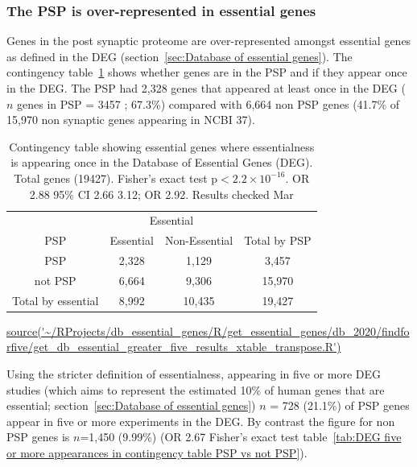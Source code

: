 \subsubsection{The PSP is over-represented in essential genes}
\label{sec:results over representation PSP in DEG genes}
Genes in the post synaptic proteome are over-represented amongst essential genes as defined in the DEG (section~\ref{sec:Database of essential genes}). The contingency table~\ref{tab:DEG any appearance contingency table PSP vs not PSP} shows whether genes are in the PSP and if they appear once in the DEG. The PSP had 2,328 genes that appeared at least once in the DEG (    $n$ genes in PSP = 3457 ; 67.3\%) compared with 6,664 non PSP genes (41.7\% of 15,970 non synaptic genes appearing in NCBI 37).








\begin{table}
\centering
\begin{tabular}{cccc}
\toprule
& \multicolumn{2}{c}{Essential} & \\
\cmidrule{2-3}
    PSP & Essential &  Non-Essential & Total by PSP\vspace{1mm} \\
\midrule 
PSP      &   2,328     &     1,129 & 3,457\vspace{1mm}\\
not PSP    &  6,664      &    9,306  & 15,970\vspace{1mm}\\
\midrule
 Total by essential & 8,992 & 10,435 &  19,427\\ 

 
\bottomrule
\end{tabular}
\caption{Contingency table showing essential genes where essentialness is appearing once in the Database of Essential Genes (DEG). Total genes (19427).  Fisher's exact test p$<2.2\times10^{-16}$. OR 2.88 95\% CI 2.66 3.12; OR 2.92. Results checked Mar}
\tiny\url{source('~/RProjects/db_essential_genes/R/get_essential_genes/db_2020/findforfive/get_db_essential_greater_five_results_xtable_transpose.R')}  
\label{tab:DEG any appearance contingency table PSP vs not PSP}
\end{table}


Using the stricter definition of essentialness, appearing in five or more DEG studies (which aims to represent the estimated 10\% of human genes that are essential; section~\ref{sec:Database of essential genes}) $n$ = 728 (21.1\%) of PSP genes appear in five or more experiments in the DEG. By contrast the figure for non PSP genes is $n$=1,450 (9.99\%) (OR 2.67 Fisher's exact test table~\ref{tab:DEG five or more appearances in contingency table PSP vs not PSP}). 




